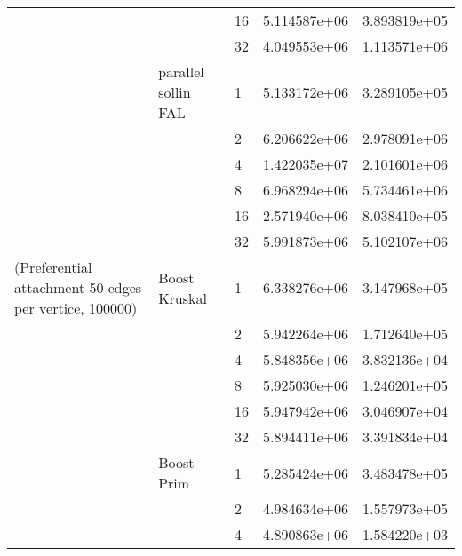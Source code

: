\begin{tabular}{lllrr}
                                                       &                     & 16 &  5.114587e+06 &  3.893819e+05 \\
                                                       &                     & 32 &  4.049553e+06 &  1.113571e+06 \\
                                                       & parallel sollin FAL & 1  &  5.133172e+06 &  3.289105e+05 \\
                                                       &                     & 2  &  6.206622e+06 &  2.978091e+06 \\
                                                       &                     & 4  &  1.422035e+07 &  2.101601e+06 \\
                                                       &                     & 8  &  6.968294e+06 &  5.734461e+06 \\
                                                       &                     & 16 &  2.571940e+06 &  8.038410e+05 \\
                                                       &                     & 32 &  5.991873e+06 &  5.102107e+06 \\
(Preferential attachment 50 edges per vertice, 100000) & Boost Kruskal & 1  &  6.338276e+06 &  3.147968e+05 \\
                                                       &                     & 2  &  5.942264e+06 &  1.712640e+05 \\
                                                       &                     & 4  &  5.848356e+06 &  3.832136e+04 \\
                                                       &                     & 8  &  5.925030e+06 &  1.246201e+05 \\
                                                       &                     & 16 &  5.947942e+06 &  3.046907e+04 \\
                                                       &                     & 32 &  5.894411e+06 &  3.391834e+04 \\
                                                       & Boost Prim & 1  &  5.285424e+06 &  3.483478e+05 \\
                                                       &                     & 2  &  4.984634e+06 &  1.557973e+05 \\
                                                       &                     & 4  &  4.890863e+06 &  1.584220e+03 \\

\end{tabular}
